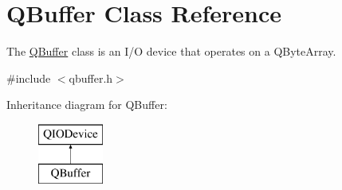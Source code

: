 \hypertarget{class_q_buffer}{}\section{Q\+Buffer Class Reference}
\label{class_q_buffer}


The \mbox{\hyperlink{class_q_buffer}{Q\+Buffer}} class is an I/O device that operates on a Q\+Byte\+Array.  




{\ttfamily \#include $<$qbuffer.\+h$>$}

Inheritance diagram for Q\+Buffer\+:\begin{figure}[H]
\begin{center}
\leavevmode
\includegraphics[height=2.000000cm]{class_q_buffer}
\end{center}
\end{figure}
